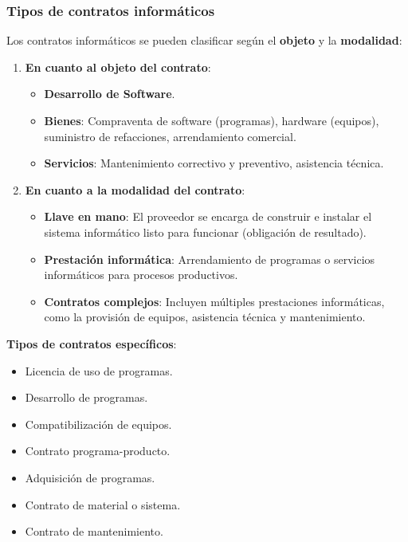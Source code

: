 \documentclass{templateNote}
\begin{document}
\subsubsection*{Tipos de contratos informáticos}
Los contratos informáticos se pueden clasificar según el \textbf{objeto} y la \textbf{modalidad}:

\begin{enumerate}
    \item \textbf{En cuanto al objeto del contrato}:
    \begin{itemize}
        \item \textbf{Desarrollo de Software}.
        \item \textbf{Bienes}: Compraventa de software (programas), hardware (equipos), suministro de refacciones, arrendamiento comercial.
        \item \textbf{Servicios}: Mantenimiento correctivo y preventivo, asistencia técnica.
    \end{itemize}
    \item \textbf{En cuanto a la modalidad del contrato}:
    \begin{itemize}
        \item \textbf{Llave en mano}: El proveedor se encarga de construir e instalar el sistema informático listo para funcionar (obligación de resultado).
        \item \textbf{Prestación informática}: Arrendamiento de programas o servicios informáticos para procesos productivos.
        \item \textbf{Contratos complejos}: Incluyen múltiples prestaciones informáticas, como la provisión de equipos, asistencia técnica y mantenimiento.
    \end{itemize}
\end{enumerate}

\noindent\textbf{Tipos de contratos específicos}:
\begin{itemize}
    \item Licencia de uso de programas.
    \item Desarrollo de programas.
    \item Compatibilización de equipos.
    \item Contrato programa-producto.
    \item Adquisición de programas.
    \item Contrato de material o sistema.
    \item Contrato de mantenimiento.
\end{itemize}
\end{document}
